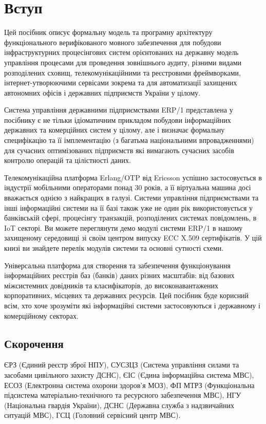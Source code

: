 \chapter{Вступ}

Цей посібник описує формальну модель та програмну архітектуру
функціонального верифікованого мовного забезпечення
для побудови інфраструктурних процесінгових систем
орієнтованих на державну модель управління
процесами для проведення зовнішнього аудиту,
різними видами розподілених сховищ,
телекомунікаційними та реєстровими фреймворками,
інтернет-утворюючими сервісами зокрема та для
автоматизації захищених автономних офісів і
державних підприємств України у цілому.

Система управління державними підприємствами ERP/1 представлена у
посібнику є не тільки ідіоматичним прикладом побудови інформаційних державних та комерційних систем у цілому,
але і визначає формальну специфікацію та її імплементацію (з багатьма національними впровадженнями)
для сучасних оптимізованих підприємств які вимагають сучасних засобів контролю операцій та цілістності даних.

Телекомунікаційна платформа Erlang/OTP від Ericsson успішно застосовується
в індустрії мобільними операторами понад 30 років, а її віртуальна машина
досі вважається однією з найкращих в галузі. Системи управління підприємствами та інші інформаційні системи
на її базі також уже не один рік використовується у банківській сфері, процесінгу транзакцій,
розподілених системах повідомлень, в IoT секторі. Ви можете переглянути демо
модулі системи ERP/1 в нашому захищеному середовищі зі своїм центром
випуску ECC X.509 сертифікатів. У цій книзі ви знайдете перелік модулів
системи та основні сутності схеми.

Універсальна платформа для створення та забезпечення функціонування
інформаційних реєстрів баз (банків) даних різних масштабів: від базових
міжсистемних довідників та класифікаторів, до високонавантажених корпоративних,
місцевих та державних ресурсів. Цей посібник буде корисний всім,
хто хоче зрозуміти які інформаційні системи застосовуються і
державному і комерційному секторах.

\section*{Скорочення}

ЄРЗ (Єдиний реєстр зброї НПУ),
СУСЗЦЗ (Система управління силами та засобами цивільного захисту ДСНС),
ЄІС (Єдина інформаційна система МВС),
ЕСОЗ (Електронна система охорони здоров'я МОЗ),
ФП МТРЗ (Функціональна підсистема матеріально-технічного та ресурсного забезпечення МВС),
НГУ (Національна гвардія України),
ДСНС (Державна служба з надзвичайних ситуацій МВС),
ГСЦ (Головний сервісний центр МВС).
